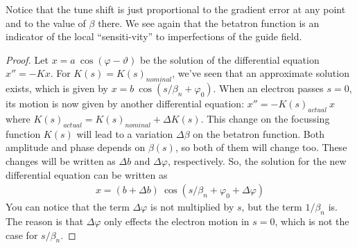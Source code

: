 Notice that the tune shift is just proportional to the gradient error at any point and to the value of $\beta$ there. We see again that the betatron function is an indicator of the local ``sensiti-vity'' to imperfections of the guide field.\\
\begin{proof}
	Let $x = a\ \cos(\varphi-\vartheta)$ be the solution of the differential equation $x'' = -Kx$. For $K(s) = K(s)_{nominal}$, we've seen that an approximate solution exists, which is given by $x = b\ \cos(s/\beta_n + \varphi_0)$. When an electron passes $s=0$, its motion is now given by another differential equation: $x'' = -K(s)_{actual}\ x$ where $K(s)_{actual} = K(s)_{nominal} + \Delta K(s)$. This change on the focussing function $K(s)$ will lead to a variation $\Delta \beta$ on the betatron function. Both amplitude and phase depends on $\beta(s)$, so both of them will change too. These changes will be written as $\Delta b$ and $\Delta \varphi$, respectively. So, the solution for the new differential equation can be written as
	\begin{align*}
		x = (b+\Delta b)\ \cos(s/\beta_n + \varphi_0 + \Delta \varphi)
	\end{align*}
	You can notice that the term $\Delta \varphi$ is not multiplied by $s$, but the term $1/\beta_n$ is. The reason is that $\Delta \varphi$ only effects the electron motion in $s=0$, which is not the case for $s/\beta_n$.


\end{proof}
